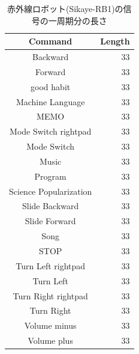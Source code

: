 \documentclass[text05.tex]{subfiles}
\begin{document}
\begin{table}[htbp] \begin{center}
    \caption{赤外線ロボット(Sikaye-RB1)の信号の一周期分の長さ}
    \label{ir_robot_signal_ideal}
    \begin{tabular}{cr}
\hline
Command & Length \\
\hline
Backward & 33 \\
Forward & 33 \\
good habit & 33 \\
Machine Language & 33 \\
MEMO & 33 \\
Mode Switch rightpad & 33 \\
Mode Switch & 33 \\
Music & 33 \\
Program & 33 \\
Science Popularization & 33 \\
Slide Backward & 33 \\
Slide Forward & 33 \\
Song & 33 \\
STOP & 33 \\
Turn Left rightpad & 33 \\
Turn Left & 33 \\
Turn Right rightpad & 33 \\
Turn Right & 33 \\
Volume minus & 33 \\
Volume plus & 33 \\
\hline
    \end{tabular}
\end{center} \end{table}
\end{document}

